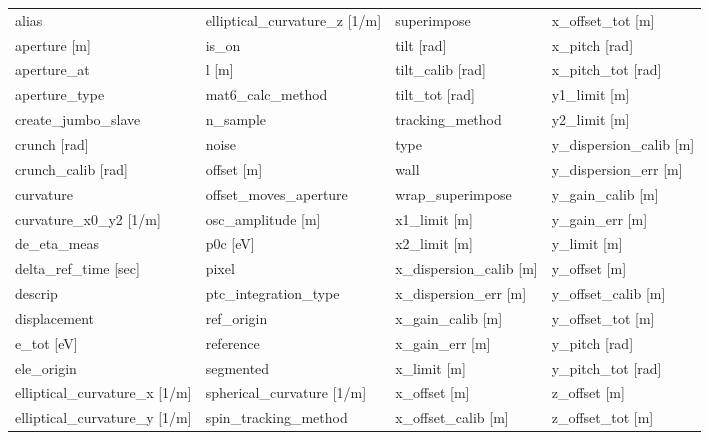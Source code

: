  \begin{tabular}{llll} \toprule
alias                            & elliptical_curvature_z [1/m]     & superimpose                      & x_offset_tot [m]                 \\
aperture [m]                     & is_on                            & tilt [rad]                       & x_pitch [rad]                    \\
aperture_at                      & l [m]                            & tilt_calib [rad]                 & x_pitch_tot [rad]                \\
aperture_type                    & mat6_calc_method                 & tilt_tot [rad]                   & y1_limit [m]                     \\
create_jumbo_slave               & n_sample                         & tracking_method                  & y2_limit [m]                     \\
crunch [rad]                     & noise                            & type                             & y_dispersion_calib [m]           \\
crunch_calib [rad]               & offset [m]                       & wall                             & y_dispersion_err [m]             \\
curvature                        & offset_moves_aperture            & wrap_superimpose                 & y_gain_calib [m]                 \\
curvature_x0_y2 [1/m]            & osc_amplitude [m]                & x1_limit [m]                     & y_gain_err [m]                   \\
de_eta_meas                      & p0c [eV]                         & x2_limit [m]                     & y_limit [m]                      \\
delta_ref_time [sec]             & pixel                            & x_dispersion_calib [m]           & y_offset [m]                     \\
descrip                          & ptc_integration_type             & x_dispersion_err [m]             & y_offset_calib [m]               \\
displacement                     & ref_origin                       & x_gain_calib [m]                 & y_offset_tot [m]                 \\
e_tot [eV]                       & reference                        & x_gain_err [m]                   & y_pitch [rad]                    \\
ele_origin                       & segmented                        & x_limit [m]                      & y_pitch_tot [rad]                \\
elliptical_curvature_x [1/m]     & spherical_curvature [1/m]        & x_offset [m]                     & z_offset [m]                     \\
elliptical_curvature_y [1/m]     & spin_tracking_method             & x_offset_calib [m]               & z_offset_tot [m]                 \\
 \bottomrule
 \end{tabular}
 \vfill
 
